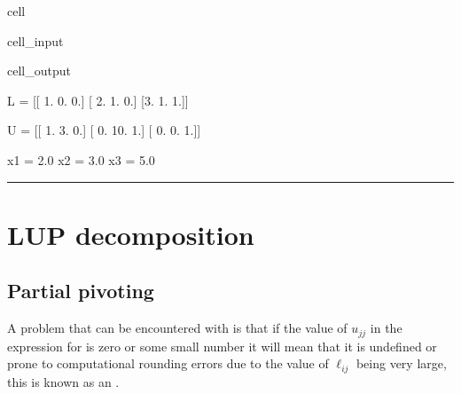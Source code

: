\documentclass[letterpaper,10pt,english]{jupyterBook}
\begin{document}
\begin{sphinxuseclass}{cell}
\begin{sphinxVerbatimInput}
\begin{sphinxuseclass}{cell_input}
\end{sphinxuseclass}\end{sphinxVerbatimInput}
\begin{sphinxVerbatimOutput}

\begin{sphinxuseclass}{cell_output}
\begin{sphinxVerbatim}[commandchars=\\\{\}]
L = 
[[ 1.  0.  0.]
 [ 2.  1.  0.]
 [\PYGZhy{}3. \PYGZhy{}1.  1.]]

U = 
[[  1.   3.   0.]
 [  0. \PYGZhy{}10.  \PYGZhy{}1.]
 [  0.   0.   1.]]

x1 = 2.0
x2 = \PYGZhy{}3.0
x3 = 5.0
\end{sphinxVerbatim}

\end{sphinxuseclass}\end{sphinxVerbatimOutput}

\end{sphinxuseclass}

\bigskip\hrule\bigskip


\sphinxstepscope


\section{LUP decomposition}
\label{\detokenize{6_Direct_methods/6.2_LUP_decomposition:lup-decomposition}}\label{\detokenize{6_Direct_methods/6.2_LUP_decomposition:lup-section}}\label{\detokenize{6_Direct_methods/6.2_LUP_decomposition::doc}}

\subsection{Partial pivoting}
\label{\detokenize{6_Direct_methods/6.2_LUP_decomposition:partial-pivoting}}\label{\detokenize{6_Direct_methods/6.2_LUP_decomposition:partial-pivoting-section}}
\sphinxAtStartPar
A problem that can be encountered with {\hyperref[\detokenize{6_Direct_methods/6.1_LU_decomposition:lu-definition}]{}} is that if the value of \(u_{jj}\) in the expression for {\hyperref[\detokenize{6_Direct_methods/6.1_LU_decomposition:lu-definition}]{}} is zero or some small number it will mean that it is undefined or prone to computational rounding errors due to the value of \(\ell_{ij}\) being very large, this is known as an .
\end{document}
